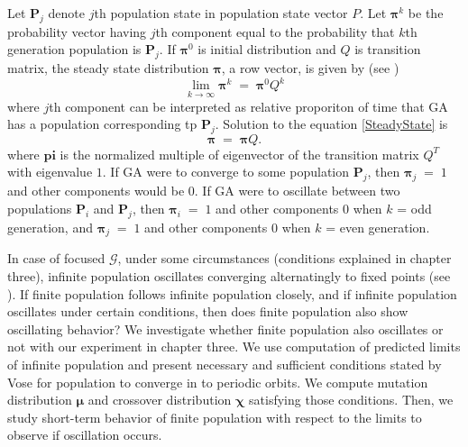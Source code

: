 Let $\bm{P}_j$ denote $j$th population state in population state vector $P$. Let $\bm{\pi}^k$ be the probability vector having $j$th component 
equal to the probability that $k$th generation population is $\bm{P}_j$. If $\bm{\pi}^0$ is initial distribution and $Q$ is transition matrix, the steady state distribution $\bm{\pi}$, a row vector, is given by (see \cite{MarkovChain})
\begin{equation}
\label{SteadyState}
\lim_{k \to \infty} \bm{\pi}^k \;=\; \bm{\pi}^0 Q^k 
\end{equation}
where $j$th component can be interpreted as relative proporiton of time that GA has a population corresponding tp $\bm{P}_j$.
Solution to the equation \ref{SteadyState} is
\begin{equation}
\label{SteadyStateSolution}
\bm{\pi} \; = \; \bm{\pi} Q.
\end{equation}
where $\bm{pi}$ is the normalized multiple of eigenvector of the transition matrix $Q^T$ with eigenvalue $1$.
If GA were to converge to some population $\bm{P}_j$, 
then $\bm{\pi}_j \;=\; 1$ and other components would be $0$. If GA were to oscillate between two populations $\bm{P}_i$ and $\bm{P}_j$, then 
$\bm{\pi}_i \;=\; 1$ and other components $0$ when $k$ = odd generation, and $\bm{\pi}_j \;=\; 1$ and other components $0$ when $k$ = even generation.

In case of focused $\mathcal{G}$, under some circumstances (conditions explained in chapter three), 
infinite population oscillates converging alternatingly to fixed points (see \cite{Vose1999}). 
If finite population follows infinite population closely, and if infinite population oscillates under certain conditions, then 
does finite population also show oscillating behavior? We investigate whether finite population also oscillates or not with our experiment 
in chapter three. We use computation of predicted limits
of infinite population and present necessary and sufficient conditions stated by Vose for population
to converge in to periodic orbits. We compute mutation distribution $\bm{\mu}$ and crossover distribution $\bm{\chi}$ 
satisfying those conditions. Then, we study short-term behavior of finite population with respect to the limits to observe if oscillation occurs.

